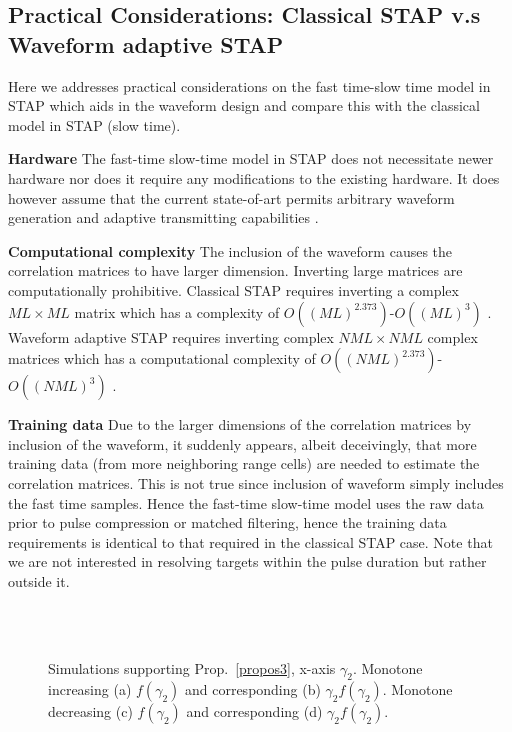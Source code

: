 \documentclass[11pt,draftclsnofoot,onecolumn]{IEEEtran}
\theoremstyle{definition}
\theoremstyle{remark}
\begin{document}
\subsection{Practical Considerations: Classical STAP v.s Waveform adaptive STAP}
Here we addresses practical considerations on the fast time-slow time model in STAP which aids in the waveform design and compare this with the classical model in STAP (slow time).

{\bf Hardware} The fast-time slow-time model in STAP does not necessitate newer hardware nor does it require any modifications to the existing hardware. It does however assume that the current state-of-art permits arbitrary waveform generation and adaptive transmitting capabilities \cite{cochran2009waveform}.

{\bf Computational complexity} The inclusion of the waveform causes the correlation matrices to have larger dimension. Inverting large matrices are computationally prohibitive. Classical STAP requires inverting a complex $ML\times ML$ matrix which has a complexity of $O((ML)^{2.373})$-$O((ML)^{3})$ \cite{VirginiaWilliams2012}. Waveform adaptive STAP requires inverting complex $NML\times NML $ complex matrices which has a computational complexity of $O((NML)^{2.373})$-$O((NML)^{3})$ \cite{VirginiaWilliams2012}.

{\bf Training data} Due to the larger dimensions of the correlation matrices by inclusion of the waveform, it suddenly appears, albeit deceivingly, that more training data (from more neighboring range cells) are needed to estimate the correlation matrices. This is not true since inclusion of waveform simply includes the fast time samples. Hence the fast-time slow-time model uses the raw data prior to pulse compression or matched filtering, hence the training data requirements is identical to that required in the classical STAP case. Note that we are not interested in resolving targets within the pulse duration but rather outside it.




\begin{figure*}[htbp!]
\centering
   \\
   \\
\caption{ Simulations supporting Prop.~\ref{propos3}, x-axis $\gamma_2$. Monotone increasing (a) $f(\gamma_2)$ and corresponding (b) $\gamma_2f(\gamma_2)$. Monotone decreasing (c) $f(\gamma_2)$ and corresponding (d) $\gamma_2f(\gamma_2)$.}
\label{lagrasupport1}
\end{figure*}
\end{document}
